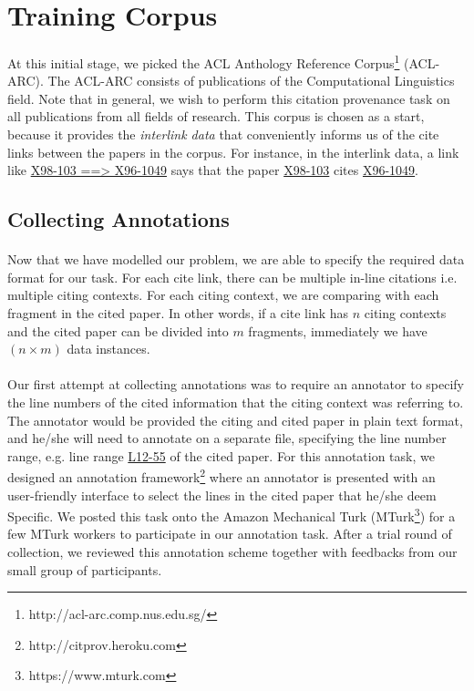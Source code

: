 \section{Training Corpus}
\paragraph{}
At this initial stage, we picked the ACL Anthology Reference Corpus\footnote{http://acl-arc.comp.nus.edu.sg/} (ACL-ARC). The ACL-ARC consists of publications of the Computational Linguistics field. Note that in general, we wish to perform this citation provenance task on all publications from all fields of research. This corpus is chosen as a start, because it provides the \textit{interlink data} that conveniently informs us of the cite links between the papers in the corpus. For instance, in the interlink data, a link like \url{X98-103 ==> X96-1049} says that the paper \url{X98-103} cites \url{X96-1049}.

\subsection{Collecting Annotations}
\paragraph{}
Now that we have modelled our problem, we are able to specify the required data format for our task. For each cite link, there can be multiple in-line citations i.e. multiple citing contexts. For each citing context, we are comparing with each fragment in the cited paper. In other words, if a cite link has $n$ citing contexts and the cited paper can be divided into $m$ fragments, immediately we have $(n \times m)$ data instances.

\paragraph{}
Our first attempt at collecting annotations was to require an annotator to specify the line numbers of the cited information that the citing context was referring to. The annotator would be provided the citing and cited paper in plain text format, and he/she will need to annotate on a separate file, specifying the line number range, e.g. line range \url{L12-55} of the cited paper. For this annotation task, we designed an annotation framework\footnote{http://citprov.heroku.com} where an annotator is presented with an user-friendly interface to select the lines in the cited paper that he/she deem Specific. We posted this task onto the Amazon Mechanical Turk (MTurk\footnote{https://www.mturk.com}) for a few MTurk workers to participate in our annotation task. After a trial round of collection, we reviewed this annotation scheme together with feedbacks from our small group of participants.

